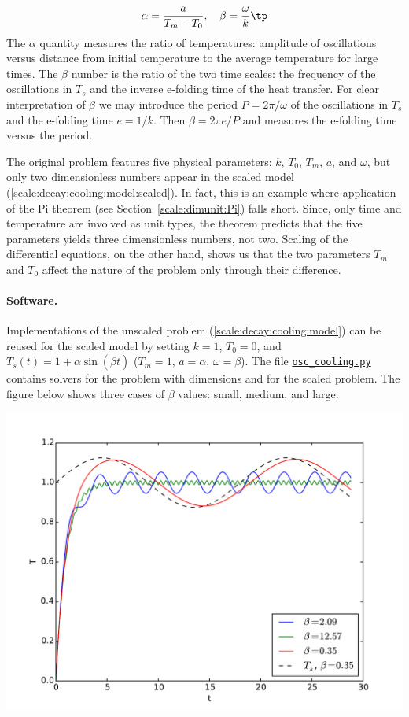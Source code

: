 \documentclass[graybox,envcountchap,sectrefs,final]{svmonodo}
\newenvironment{notice_mdfboxadmon}[1][]{
\begin{notice_mdfboxmdframed}[frametitle=#1]
}
{
\end{notice_mdfboxmdframed}
}
\begin{document}
\[ \alpha = \frac{a}{T_m-T_0},\quad \beta = \frac{\omega}{k}\tp\]
The $\alpha$ quantity measures the ratio of temperatures: amplitude of
oscillations versus distance from initial temperature to the average
temperature for large times.  The $\beta$ number is the ratio of the
two time scales: the frequency of the oscillations in $T_s$ and the
inverse e-folding time of the heat transfer. For clear interpretation
of $\beta$ we may introduce the period $P=2\pi/\omega$ of the
oscillations in $T_s$ and the e-folding time $e=1/k$. Then $\beta =
2\pi e/P$ and measures the e-folding time versus the period.


\begin{notice_mdfboxadmon}[Remark]
The original problem features five physical parameters: $k$, $T_0$,
$T_m$, $a$, and $\omega$, but only two dimensionless numbers appear in the
scaled model (\ref{scale:decay:cooling:model:scaled}).
In fact, this is an example where application of the Pi theorem
(see Section~\ref{scale:dimunit:Pi}) falls
short. Since, only time and temperature are involved as unit types, the
theorem predicts that the five parameters yields three dimensionless numbers,
not two. Scaling of the differential equations, on the other hand,
shows us that the two parameters
$T_m$ and $T_0$ affect the nature of the problem only through their difference.
\end{notice_mdfboxadmon}



\paragraph{Software.}
Implementations of the unscaled problem (\ref{scale:decay:cooling:model})
can be reused for the scaled model by setting $k=1$, $T_0=0$, and
$T_s(t) = 1 + \alpha\sin (\beta \bar t)$ ($T_m=1$, $a=\alpha$, $\omega =\beta$).
The file \href{{http://tinyurl.com/o8pb3yy/osc_cooling.py}}{\nolinkurl{osc_cooling.py}} contains
solvers for the problem with dimensions and
for the scaled problem. The figure below
shows three cases of $\beta$ values: small, medium, and large.



\centerline{\includegraphics[width=0.8\linewidth]{fig-scaling/osc_cooling.pdf}}
\end{document}
